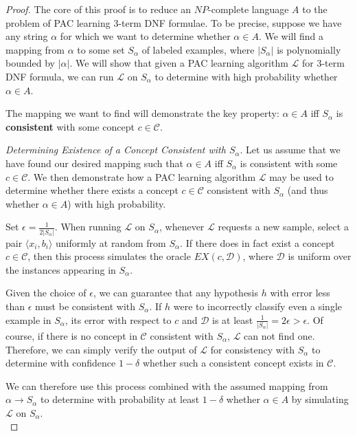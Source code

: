 \documentclass{article}
\begin{document}
\begin{proof}
The core of this proof is to reduce an $NP$-complete language $A$ to the problem
of PAC learning 3-term DNF formulae. To be precise, suppose we have any string
$\alpha$ for which we want to determine whether $\alpha \in A$. We will find a
mapping from $\alpha$ to some set $S_\alpha$ of labeled examples, where
$|S_\alpha|$ is polynomially bounded by $|\alpha|$. We will show that given a
PAC learning algorithm $\mathcal{L}$ for 3-term DNF formula, we can run
$\mathcal{L}$ on $S_\alpha$ to determine with
high probability whether $\alpha \in A$.

The mapping we want to find will demonstrate the key property: $\alpha \in A$
iff $S_\alpha$ is \textbf{consistent} with some concept $c \in \mathcal{C}$.

\emph{Determining Existence of a Concept Consistent with $S_\alpha$}. Let us
assume that we have found our desired mapping such that $\alpha \in A$ iff
$S_\alpha$ is consistent with some $c \in \mathcal{C}$. We then demonstrate how
a PAC learning algorithm $\mathcal{L}$ may be used to determine whether there
exists a concept $c \in \mathcal{C}$ consistent with $S_\alpha$ (and thus
whether $\alpha \in A$) with high probability.

Set $\epsilon = \frac{1}{2|S_\alpha|}$. When running $\mathcal{L}$ on
$S_\alpha$, whenever $\mathcal{L}$ requests a new sample, select a pair
$\langle x_i, b_i \rangle$ uniformly at random from $S_\alpha$. If there does in
fact exist a concept $c \in \mathcal{C}$, then this process simulates the oracle
$EX(c, \mathcal{D})$, where $\mathcal{D}$ is uniform over the instances
appearing in $S_\alpha$.

Given the choice of $\epsilon$, we can guarantee that any hypothesis $h$ with
error less than $\epsilon$ must be consistent with $S_\alpha$. If $h$ were to
incorrectly classify even a single example in $S_\alpha$, its error with respect
to $c$ and $\mathcal{D}$ is at least $\frac{1}{|S_\alpha|} = 2\epsilon > \epsilon$.
Of course, if there is no concept in $\mathcal{C}$ consistent with $S_\alpha$,
$\mathcal{L}$ can not find one. Therefore, we can simply verify the output of
$\mathcal{L}$ for consistency with $S_\alpha$ to determine with confidence
$1 - \delta$ whether such a consistent concept exists in $\mathcal{C}$.

We can therefore use this process combined with the assumed mapping from
$\alpha \rightarrow S_\alpha$ to determine with probability at least
$1-\delta$ whether $\alpha \in A$ by simulating $\mathcal{L}$ on $S_\alpha$.\\


\end{proof}
\end{document}
